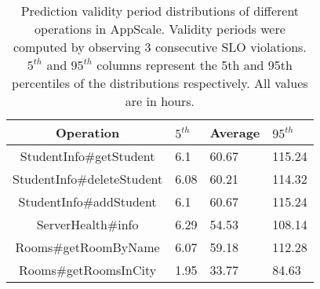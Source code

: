 \begin{table}
\caption{Prediction validity period distributions of different operations in
AppScale. Validity periods were computed by observing $3$ consecutive SLO
violations. $5^{th}$ and $95^{th}$ 
columns represent the 5th and 95th percentiles of the
distributions respectively. All values are in hours.
\label{tab:as_validity}
}
\begin{center}
\begin{tabular}{|c|p{2cm}|p{2cm}|p{2cm}|}
\hline
Operation & $5^{th}$ & Average & $95^{th}$ \\ \hline
StudentInfo\#getStudent & 6.1 & 60.67 & 115.24 \\ \hline
StudentInfo\#deleteStudent & 6.08 & 60.21 & 114.32 \\ \hline
StudentInfo\#addStudent & 6.1 & 60.67 & 115.24 \\ \hline
ServerHealth\#info & 6.29 & 54.53 & 108.14 \\ \hline
Rooms\#getRoomByName & 6.07 & 59.18 & 112.28 \\ \hline
Rooms\#getRoomsInCity & 1.95 & 33.77 & 84.63 \\ \hline
\end{tabular}
\end{center}
\vspace{-0.2in}
\end{table}



